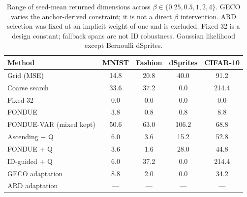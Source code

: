 \begin{table}[H]
\caption{Range of seed-mean returned dimensions across $\beta\in\{0.25,0.5,1,2,4\}$. GECO varies the anchor-derived constraint; it is not a direct $\beta$ intervention. ARD selection was fixed at an implicit weight of one and is excluded. Fixed 32 is a design constant; fallback spans are not ID robustness. Gaussian likelihood except Bernoulli dSprites.}\label{tab:span}
\small
\setlength{\tabcolsep}{3.5pt}
\begin{tabular*}{\textwidth}{@{\extracolsep{\fill}}lcccc@{}}
\toprule
Method & MNIST & Fashion & dSprites & CIFAR-10 \\
\midrule
Grid (MSE) & 14.8 & 20.8 & 40.0 & 91.2 \\
Coarse search & 33.6 & 37.2 & 0.0 & 214.4 \\
Fixed 32 & 0.0 & 0.0 & 0.0 & 0.0 \\
FONDUE & 3.8 & 0.8 & 0.8 & 8.8 \\
FONDUE-VAR (mixed kept) & 50.6 & 63.0 & 106.2 & 68.8 \\
Ascending + Q & 6.0 & 3.6 & 15.2 & 52.8 \\
FONDUE + Q & 3.6 & 1.6 & 28.0 & 44.8 \\
ID-guided + Q & 6.0 & 37.2 & 0.0 & 214.4 \\
GECO adaptation & 8.8 & 2.0 & 0.0 & 34.2 \\
ARD adaptation & --- & --- & --- & --- \\
\bottomrule
\end{tabular*}
\end{table}
